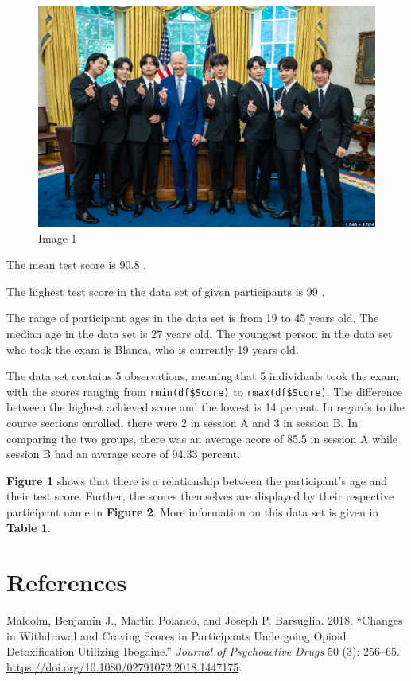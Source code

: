 \documentclass[
  letterpaper,
  DIV=11,
  numbers=noendperiod]{scrartcl}
\newlength{\cslhangindent}
\newenvironment{CSLReferences}[2] %
 {\begin{list}{}{%
  \setlength{\itemindent}{0pt}
  \setlength{\leftmargin}{0pt}
  \setlength{\parsep}{0pt}
  \ifodd #1
   \setlength{\leftmargin}{\cslhangindent}
   \setlength{\itemindent}{-1\cslhangindent}
  \fi
  \setlength{\itemsep}{#2\baselineskip}}}
 {\end{list}}
\begin{document}
\begin{figure}[H]

{\centering \includegraphics{bts_whitehouse.png}

}

\caption{Image 1}

\end{figure}%

The mean test score is 90.8 .

The highest test score in the data set of given participants is 99 .

The range of participant ages in the data set is from 19 to 45 years
old. The median age in the data set is 27 years old. The youngest person
in the data set who took the exam is Blanca, who is currently 19 years
old.

The data set contains 5 observations, meaning that 5 individuals took
the exam; with the scores ranging from \texttt{rmin(df\$Score)} to
\texttt{rmax(df\$Score)}. The difference between the highest achieved
score and the lowest is 14 percent. In regards to the course sections
enrolled, there were 2 in session A and 3 in session B. In comparing the
two groups, there was an average acore of 85.5 in session A while
session B had an average score of 94.33 percent.

\textbf{Figure 1} shows that there is a relationship between the
participant's age and their test score. Further, the scores themselves
are displayed by their respective participant name in \textbf{Figure 2}.
More information on this data set is given in \textbf{Table 1}.

\section{References}\label{references}

\label{refs}
\begin{CSLReferences}{1}{0}
Malcolm, Benjamin J., Martin Polanco, and Joseph P. Barsuglia. 2018.
{``Changes in {Withdrawal} and {Craving Scores} in {Participants
Undergoing Opioid Detoxification Utilizing Ibogaine}.''} \emph{Journal
of Psychoactive Drugs} 50 (3): 256--65.
\url{https://doi.org/10.1080/02791072.2018.1447175}.

\end{CSLReferences}
\end{document}

